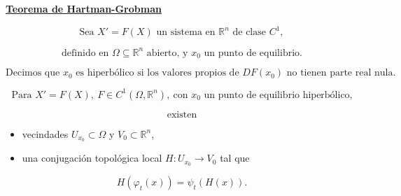 ﻿\documentclass[11pt,letterpaper]{article}
\begin{document}
\underline{\textbf{Teorema de Hartman-Grobman}}

\[
\text{Sea } X'=F(X) \text{ un sistema en } \mathbb{R}^n \text{ de clase } C^1,
\]

\[
\text{definido en } \Omega\subseteq \mathbb{R}^n \text{ abierto, y } x_0 \text{ un punto de equilibrio.}
\]

\[
\text{Decimos que } x_0 \text{ es hiperb\'olico si los valores propios de } DF(x_0)
\text{ no tienen parte real nula.}
\]

\[
\text{Para } X'=F(X),\ F\in C^1(\Omega,\mathbb{R}^n),\ \text{con } x_0 \text{ un punto de equilibrio hiperb\'olico,}
\]

\[
\text{existen}
\]

\begin{itemize}
\item[(i)] vecindades \(U_{x_0}\subset \Omega\) y \(V_0\subset \mathbb{R}^n\),
\item[(ii)] una conjugaci\'on topol\'ogica local \(H:U_{x_0}\to V_0\) tal que
\end{itemize}

\[
H(\varphi_t(x))=\psi_t(H(x)).
\]
\end{document}

